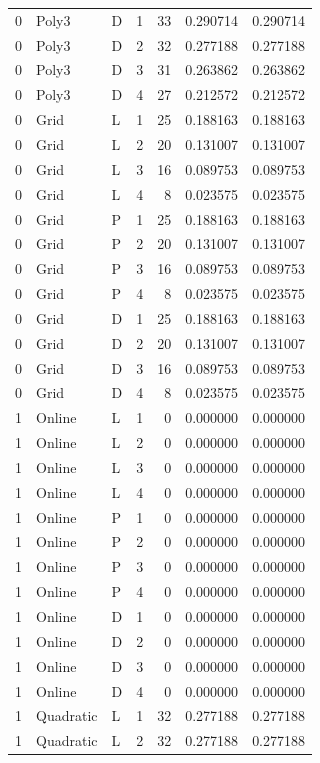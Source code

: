\begin{longtable}{lllrrrr}
0 & Poly3 & D & 1 & 33 & 0.290714 & 0.290714 \\
0 & Poly3 & D & 2 & 32 & 0.277188 & 0.277188 \\
0 & Poly3 & D & 3 & 31 & 0.263862 & 0.263862 \\
0 & Poly3 & D & 4 & 27 & 0.212572 & 0.212572 \\
0 & Grid & L & 1 & 25 & 0.188163 & 0.188163 \\
0 & Grid & L & 2 & 20 & 0.131007 & 0.131007 \\
0 & Grid & L & 3 & 16 & 0.089753 & 0.089753 \\
0 & Grid & L & 4 & 8 & 0.023575 & 0.023575 \\
0 & Grid & P & 1 & 25 & 0.188163 & 0.188163 \\
0 & Grid & P & 2 & 20 & 0.131007 & 0.131007 \\
0 & Grid & P & 3 & 16 & 0.089753 & 0.089753 \\
0 & Grid & P & 4 & 8 & 0.023575 & 0.023575 \\
0 & Grid & D & 1 & 25 & 0.188163 & 0.188163 \\
0 & Grid & D & 2 & 20 & 0.131007 & 0.131007 \\
0 & Grid & D & 3 & 16 & 0.089753 & 0.089753 \\
0 & Grid & D & 4 & 8 & 0.023575 & 0.023575 \\
1 & Online & L & 1 & 0 & 0.000000 & 0.000000 \\
1 & Online & L & 2 & 0 & 0.000000 & 0.000000 \\
1 & Online & L & 3 & 0 & 0.000000 & 0.000000 \\
1 & Online & L & 4 & 0 & 0.000000 & 0.000000 \\
1 & Online & P & 1 & 0 & 0.000000 & 0.000000 \\
1 & Online & P & 2 & 0 & 0.000000 & 0.000000 \\
1 & Online & P & 3 & 0 & 0.000000 & 0.000000 \\
1 & Online & P & 4 & 0 & 0.000000 & 0.000000 \\
1 & Online & D & 1 & 0 & 0.000000 & 0.000000 \\
1 & Online & D & 2 & 0 & 0.000000 & 0.000000 \\
1 & Online & D & 3 & 0 & 0.000000 & 0.000000 \\
1 & Online & D & 4 & 0 & 0.000000 & 0.000000 \\
1 & Quadratic & L & 1 & 32 & 0.277188 & 0.277188 \\
1 & Quadratic & L & 2 & 32 & 0.277188 & 0.277188 \\

\end{longtable}
